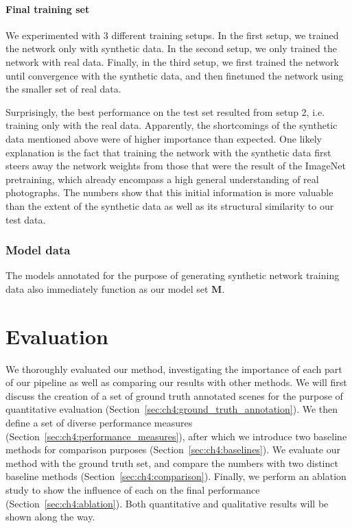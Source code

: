 \documentclass[10pt,twocolumn,letterpaper]{article}
\newcommand{\bb}[1]{{\bm{#1}}}
\begin{document}
\paragraph{Final training set} We experimented with 3 different training setups.
In the first setup, we trained the network only with synthetic data. In the second setup,
we only trained the network with real data. Finally, in the third setup, we 
first trained the network until convergence with the synthetic data,
and then finetuned the network using the smaller set of real data.

Surprisingly, the best performance on the test set resulted from setup 2, i.e.
training only with the real data. Apparently, the shortcomings of the synthetic
data mentioned above were of higher importance than expected. One likely
explanation is the fact that training the network with the synthetic data first
steers away the network weights from those that were the result of the ImageNet
pretraining, which already encompass a high general understanding of real
photographs. The numbers show that this initial information is more valuable than the
extent of the synthetic data as well as its structural similarity to our test
data.

\subsubsection{Model data} The models annotated for the purpose of generating
synthetic network training data also immediately function as our model set
$\bb{M}$.

\section{Evaluation}
\label{sec:ch4:evaluation}
We thoroughly evaluated our method, investigating the importance of each part
of our pipeline as well as comparing our results with other methods.  We will
first discuss the creation of a set of ground truth annotated scenes for the
purpose of quantitative evaluation (Section~\ref{sec:ch4:ground_truth_annotation}). We then define
a set of diverse performance measures (Section~\ref{sec:ch4:performance_measures}), after which we introduce two baseline methods for comparison purposes (Section~\ref{sec:ch4:baselines}). We evaluate our method with the ground truth set,
and compare the numbers with two distinct baseline methods (Section~\ref{sec:ch4:comparison}). Finally, we perform
an ablation study to show the influence of each on the final performance (Section~\ref{sec:ch4:ablation}). Both
quantitative and qualitative results will be shown along the way.
\end{document}

